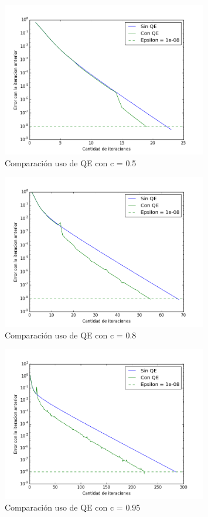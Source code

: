 \begin{figure}[H]
  \centering
    \includegraphics[width=0.8\textwidth]{comparando5.png}
    \caption{Comparaci\'on uso de QE con c = 0.5}
    \label{}
\end{figure}

\begin{figure}[H]
  \centering
    \includegraphics[width=0.8\textwidth]{comparando8.png}
    \caption{Comparaci\'on uso de QE con c = 0.8}
    \label{}
\end{figure}

\begin{figure}[H]
  \centering
    \includegraphics[width=0.8\textwidth]{comparando95.png}
    \caption{Comparaci\'on uso de QE con c = 0.95}
    \label{}
\end{figure}

